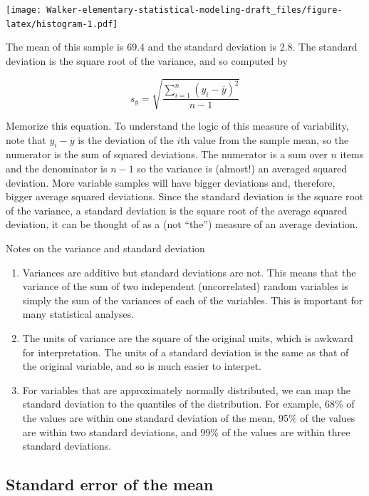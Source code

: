 \documentclass[]{book}
\providecommand{\tightlist}{%
  \setlength{\itemsep}{0pt}\setlength{\parskip}{0pt}}
\theoremstyle{definition}
\theoremstyle{definition}
\theoremstyle{definition}
\theoremstyle{remark}
\begin{document}
\texttt{[image: Walker-elementary-statistical-modeling-draft\_files/figure-latex/histogram-1.pdf]}

The mean of this sample is 69.4 and the standard deviation is 2.8. The
standard deviation is the square root of the variance, and so computed
by

\begin{equation}
s_y = \sqrt{\frac{\sum_{i=1}^n{(y_i - \overline{y})^2}}{n-1}}
\label{eq:variance}
\end{equation}

Memorize this equation. To understand the logic of this measure of
variability, note that \(y_i - \overline{y}\) is the deviation of the
\(i\)th value from the sample mean, so the numerator is the sum of
squared deviations. The numerator is a sum over \(n\) items and the
denominator is \(n-1\) so the variance is (almost!) an averaged squared
deviation. More variable samples will have bigger deviations and,
therefore, bigger average squared deviations. Since the standard
deviation is the square root of the variance, a standard deviation is
the square root of the average squared deviation, it can be thought of
as a (not ``the'') measure of an average deviation.

Notes on the variance and standard deviation

\begin{enumerate}
\def\labelenumi{\arabic{enumi}.}
\tightlist
\item
  Variances are additive but standard deviations are not. This means
  that the variance of the sum of two independent (uncorrelated) random
  variables is simply the sum of the variances of each of the variables.
  This is important for many statistical analyses.
\item
  The units of variance are the square of the original units, which is
  awkward for interpretation. The units of a standard deviation is the
  same as that of the original variable, and so is much easier to
  interpet.
\item
  For variables that are approximately normally distributed, we can map
  the standard deviation to the quantiles of the distribution. For
  example, 68\% of the values are within one standard deviation of the
  mean, 95\% of the values are within two standard deviations, and 99\%
  of the values are within three standard deviations.
\end{enumerate}

\subsection{Standard error of the
mean}\label{standard-error-of-the-mean}
\end{document}
